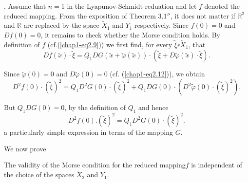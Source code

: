 \medskip
{}. Assume that $n = 1$  in the 
Lyapunov-Schmidt reduation and let $f$ denoted the reduced mapping. From the 
exposition of Theorem 3.1$''$, it does not matter if $\mathbb{R}^{2}$ and $\mathbb{R}$ are replaced by the space $\widetilde{X}_{1}$ and $Y_{1}$ respectively. Since $f(0) = 0$ and $Df(0) = 0$, it remains to check whether the Morse condition holds. By definition of $f$ (cf.(\ref{chap1-eq2.9})) we first find, for every $\widetilde{\xi} \epsilon \widetilde{X}_{1}$, that
$$
Df(\widetilde{x}) \cdot \widetilde{\xi} = Q_{1} DG(\widetilde{x} + \widetilde{\varphi}(\widetilde{x})) \cdot (\widetilde{\xi} + D\widetilde{\varphi}(\widetilde{x}) \cdot \widetilde{\xi}).
$$

Since $\widetilde{\varphi}(0) = 0$ and $D\widetilde{\varphi}(0) = 0$ (cf. (\ref{chap1-eq2.12})), we obtain
$$
D^{2}f(0) \cdot (\widetilde{\xi})^{2} = Q_{1}D^{2}G(0) \cdot (\widetilde{\xi})^{2} + Q_{1}DG(0) \cdot (D^{2} \widetilde{\varphi}(0) \cdot (\widetilde{\xi})^{2}).
$$

But $Q_{1}DG(0) = 0$, by the definition of $Q_{1}$ and hence
\begin{equation*}
D^{2}f(0). (\widetilde{\xi})^{2} = Q_{1}D^{2}G(0) \cdot (\widetilde{\xi})^{2}.
\end{equation*}
a particularly simple expression in terms of the mapping $G$.

We now prove
\begin{theorem}\label{chap1-thm3.2}
The validity of the Morse condition for the reduced mapping\pageoriginale $f$  is independent of the choice of the spaces $\widetilde{X}_{2}$ and $Y_{1}$.
\end{theorem}

